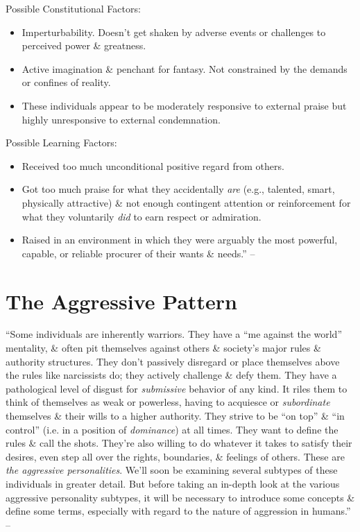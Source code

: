 \documentclass{article}
\numberwithin{equation}{section}
\begin{document}
Possible Constitutional Factors:
\begin{itemize}
	\item Imperturbability. Doesn't get shaken by adverse events or challenges to perceived power \& greatness.
	\item Active imagination \& penchant for fantasy. Not constrained by the demands or confines of reality.
	\item These individuals appear to be moderately responsive to external praise but highly unresponsive to external condemnation.
\end{itemize}
Possible Learning Factors:
\begin{itemize}
	\item Received too much unconditional positive regard from others.
	\item Got too much praise for what they accidentally \textit{are} (e.g., talented, smart, physically attractive) \& not enough contingent attention or reinforcement for what they voluntarily \textit{did} to earn respect or admiration.
	\item Raised in an environment in which they were arguably the most powerful, capable, or reliable procurer of their wants \& needs.'' -- \cite[pp. 77--86]{Simon2011}
\end{itemize}


\section{The Aggressive Pattern}
``Some individuals are inherently warriors. They have a ``me against the world'' mentality, \& often pit themselves against others \& society's major rules \& authority structures. They don't passively disregard or place themselves above the rules like narcissists do; they actively challenge \& defy them. They have a pathological level of disgust for \textit{submissive} behavior of any kind. It riles them to think of themselves as weak or powerless, having to acquiesce or \textit{subordinate} themselves \& their wills to a higher authority. They strive to be ``on top'' \& ``in control'' (i.e. in a position of \textit{dominance}) at all times. They want to define the rules \& call the shots. They're also willing to do whatever it takes to satisfy their desires, even step all over the rights, boundaries, \& feelings of others. These are \textit{the aggressive personalities}. We'll soon be examining several subtypes of these individuals in greater detail. But before taking an in-depth look at the various aggressive personality subtypes, it will be necessary to introduce some concepts \& define some terms, especially with regard to the nature of aggression in humans.'' -- \cite[p. 87]{Simon2011}
\end{document}
